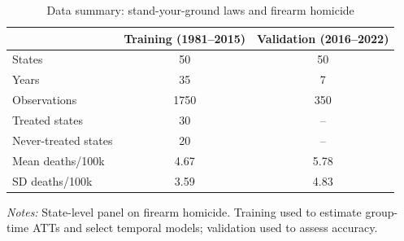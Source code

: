 \begin{table}[htbp]
\centering
\caption{Data summary: stand-your-ground laws and firearm homicide}
\label{tab:app_data}
\begin{tabular}{lcc}
\toprule
 & Training (1981--2015) & Validation (2016--2022) \\
\midrule
States & 50 & 50 \\
Years & 35 & 7 \\
Observations & 1750 & 350 \\
\midrule
Treated states & 30 & -- \\
Never-treated states & 20 & -- \\
\midrule
Mean deaths/100k & 4.67 & 5.78 \\
SD deaths/100k & 3.59 & 4.83 \\
\bottomrule
\end{tabular}
\begin{minipage}{\textwidth}
\vspace{0.1in}\footnotesize
\textit{Notes:} State-level panel on firearm homicide. Training used to estimate
group-time ATTs and select temporal models; validation used to assess accuracy.
\end{minipage}
\end{table}
